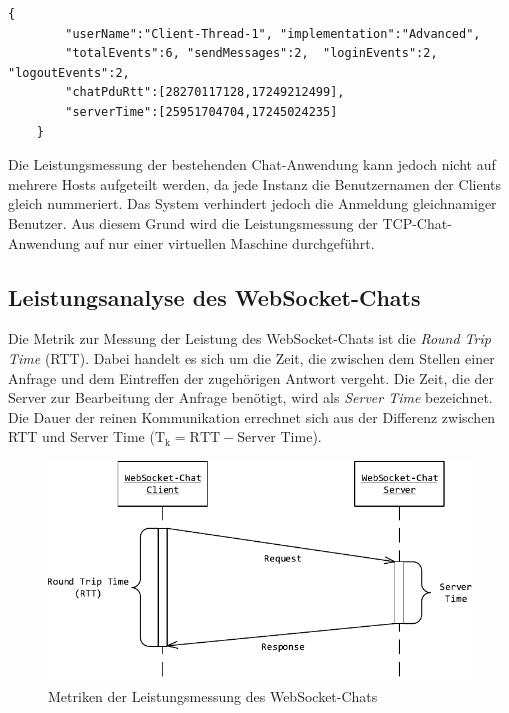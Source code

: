 \documentclass[11pt,a4paper,titlepage]{scrartcl}
\numberwithin{equation}{section}
\begin{document}
\begin{lstlisting}[frame=single, caption=Resultat eines Benchmark-Clients, label=lst:evalJSONResultat]
	{
		"userName":"Client-Thread-1", "implementation":"Advanced",
		"totalEvents":6, "sendMessages":2,	"loginEvents":2, "logoutEvents":2,
		"chatPduRtt":[28270117128,17249212499],
		"serverTime":[25951704704,17245024235]
	}
\end{lstlisting}

\noindent Die Leistungsmessung der bestehenden Chat-Anwendung kann jedoch nicht auf mehrere Hosts aufgeteilt werden, da jede Instanz die Benutzernamen der Clients gleich nummeriert. Das System verhindert jedoch die Anmeldung gleichnamiger Benutzer. Aus diesem Grund wird die Leistungsmessung der TCP-Chat-Anwendung auf nur einer virtuellen Maschine durchgeführt.

\subsection{Leistungsanalyse des WebSocket-Chats} \label{subsec:Benchmark}
Die Metrik zur Messung der Leistung des WebSocket-Chats ist die \textit{Round Trip Time} (RTT). Dabei handelt es sich um die Zeit, die zwischen dem Stellen einer Anfrage und dem Eintreffen der zugehörigen Antwort vergeht. Die Zeit, die der Server zur Bearbeitung der Anfrage benötigt, wird als \textit{Server Time} bezeichnet. Die Dauer der reinen Kommunikation errechnet sich aus der Differenz zwischen RTT und Server Time ($ \text{T}_{\text{k}} = \text{RTT}-\text{Server Time} $).
\medskip
\begin{figure}[ht] 
	\begin{center}
		\includegraphics[scale=0.85]{img/rtt.pdf}
		\caption{Metriken der Leistungsmessung des WebSocket-Chats}
		\label{fig:RTT}
	\end{center}
\end{figure}
\end{document}
